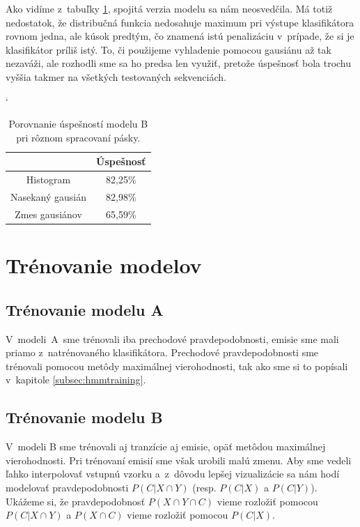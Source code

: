 Ako vidíme z~tabuľky \ref{tab:success-b-tape}, spojitá verzia modelu sa nám neosvedčila. Má totiž nedostatok, že distribučná funkcia nedosahuje maximum pri výstupe klasifikátora rovnom jedna, ale kúsok predtým, čo znamená istú penalizáciu v~prípade, že si je klasifikátor príliš istý. To, či použijeme vyhladenie pomocou gausiánu až tak nezaváži, ale rozhodli sme sa ho predsa len využiť, pretože úspešnosť bola trochu vyššia takmer na všetkých testovaných sekvenciách.


\begin{table}[h]
\catcode`
\centering
\begin{tabular}{cc}
\toprule
& Úspešnosť\\
\midrule
Histogram & 82,25\%\\
Nasekaný gausián & 82,98\%\\
Zmes gausiánov & 65,59\%\\
\bottomrule
\end{tabular}
\vspace{0.5cm}
\caption[Porovnanie úspešností pri rôznom spracovaní pásky]{Porovnanie úspešností modelu B pri rôznom spracovaní pásky.}
\label{tab:success-b-tape}
\end{table}

\section{Trénovanie modelov}

\subsection{Trénovanie modelu A}

V~modeli~A~sme trénovali iba prechodové pravdepodobnosti, emisie sme mali priamo z~natrénovaného klasifikátora. Prechodové pravdepodobnosti sme trénovali pomocou metôdy maximálnej vierohodnosti, tak ako sme si to popísali v~kapitole \ref{subsec:hmmtraining}.

\subsection{Trénovanie modelu B}

V~modeli B sme trénovali aj tranzície aj emisie, opäť metôdou maximálnej vierohodnosti. Pri trénovaní emisií sme však urobili malú zmenu. Aby sme vedeli ľahko interpolovať vstupnú vzorku a~z~dôvodu lepšej vizualizácie sa nám hodí modelovať pravdepodobnosti $P(C|X \cap Y)$ (resp. $P(C|X)$ a $P(C|Y)$). Ukážeme si, že pravdepodobnosť $P(X \cap Y \cap C)$ vieme rozložiť pomocou $P(C|X \cap Y)$ a $P(X \cap C)$ vieme rozložiť pomocou $P(C|X)$.

